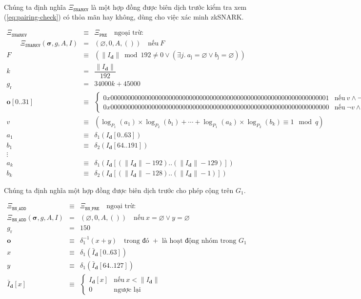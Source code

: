 \documentclass[9pt,oneside]{amsart}
\begin{document}
Chúng ta định nghĩa $\Xi_{\mathtt{SNARKV}}$ là một hợp đồng được biên dịch trước kiểm tra xem (\ref{eq:pairing-check}) có thỏa mãn hay không, dùng cho việc xác minh zkSNARK.

\begin{eqnarray}
\Xi_{\mathtt{SNARKV}}&\equiv&\Xi_{\mathtt{PRE}}\quad\text{ngoại trừ:}\\
\qquad\Xi_{\mathtt{SNARKV}}(\boldsymbol\sigma,g,A,I)&=&\left(\varnothing,0,A,()\right)\quad\text{nếu}\ F\\
F&\equiv&(\lVert I_{\mathbf{d}} \rVert\bmod 192\neq 0\vee(\exists j.\ a_{\mathrm{j}}=\varnothing\vee b_{\mathrm{j}}=\varnothing))\\
k &=& \dfrac{\lVert I_{\mathbf{d}} \rVert}{192} \\
g_{\mathrm{r}}&=& 34000k + 45000 \\
\mathbf{o}[0..31]&\equiv&\begin{cases}
0x0000000000000000000000000000000000000000000000000000000000000001&\text{nếu}\ v\wedge\neg F\\
0x0000000000000000000000000000000000000000000000000000000000000000&\text{nếu}\ \neg v\wedge\neg F
\end{cases}\\
v&\equiv&(\log_{P_1}(a_1)\times\log_{P_2}(b_1)+\cdots+\log_{P_1}(a_k)\times\log_{P_2}(b_k)\equiv 1\mod q)\\
a_1&\equiv&\delta_1(I_{\mathbf{d}}[0..63])\\
b_1&\equiv&\delta_2(I_{\mathbf{d}}[64..191])\\\nonumber
\vdots\\
a_k&\equiv&\delta_1(I_{\mathbf{d}}[(\lVert I_{\mathbf{d}} \rVert-192)..(\lVert I_{\mathbf{d}} \rVert-129)])\\
b_k&\equiv&\delta_2(I_{\mathbf{d}}[(\lVert I_{\mathbf{d}} \rVert-128)..(\lVert I_{\mathbf{d}} \rVert-1)])
\end{eqnarray}

Chúng ta định nghĩa một hợp đồng được biên dịch trước cho phép cộng trên $G_1$.

\begin{eqnarray}
\Xi_{\mathtt{BN\_ADD}}&\equiv&\Xi_{\mathtt{BN\_PRE}}\quad\text{ngoại trừ:}\\
\Xi_{\mathtt{BN\_ADD}}(\boldsymbol\sigma,g,A,I)&=&\left(\varnothing,0,A,()\right)\quad\text{nếu}\ x=\varnothing\vee y=\varnothing\\
g_{\mathrm{r}} &=& 150\\
\mathbf{o}&\equiv&\delta_1^{-1}(x+y)\quad\text{trong đó $+$ là hoạt động nhóm trong $G_1$}\\
x&\equiv&\delta_1\left(\bar I_{\mathbf{d}}[0..63]\right)\\
y&\equiv&\delta_1\left(\bar I_{\mathbf{d}}[64..127]\right)\\
\label{eq:complemented_input}\bar I_{\mathbf{d}}[x]&\equiv&\begin{cases}
I_{\mathbf{d}}[x]&\text{nếu}\ x < \lVert I_{\mathbf{d}} \rVert\\
0&\text{ngược lại}
\end{cases}
\end{eqnarray}
\end{document}
